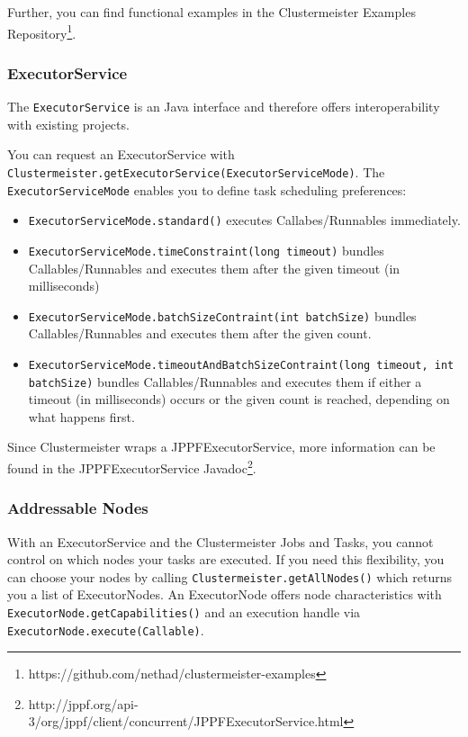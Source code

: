 \documentclass{article}
\begin{document}
Further, you can find functional examples in the Clustermeister Examples Repository\footnote{https://github.com/nethad/clustermeister-examples}.

\subsubsection{ExecutorService}

The \texttt{ExecutorService} is an Java interface and therefore offers interoperability with existing projects.

You can request an ExecutorService with \texttt{Clustermeister.getExecutorService(ExecutorServiceMode)}. The \texttt{ExecutorServiceMode} enables you to define task scheduling preferences:

\begin{itemize}
 \item \texttt{ExecutorServiceMode.standard()} executes Callabes/Runnables immediately.
 \item \texttt{ExecutorServiceMode.timeConstraint(long timeout)} bundles Callables/Runnables and executes them after the given timeout (in milliseconds)
 \item \texttt{ExecutorServiceMode.batchSizeContraint(int batchSize)} bundles Callables/Runnables and executes them after the given count.
 \item \texttt{ExecutorServiceMode.timeoutAndBatchSizeContraint(long timeout, int batchSize)} bundles Callables/Runnables and executes them if either a timeout (in milliseconds) occurs or the given count is reached, depending on what happens first.
\end{itemize}

Since Clustermeister wraps a JPPFExecutorService, more information can be found in the JPPFExecutorService Javadoc\footnote{http://jppf.org/api-3/org/jppf/client/concurrent/JPPFExecutorService.html}.

\subsubsection{Addressable Nodes}

With an ExecutorService and the Clustermeister Jobs and Tasks, you cannot control on which nodes your tasks are executed. If you need this flexibility, you can choose your nodes by calling \texttt{Clustermeister.getAllNodes()} which returns you a list of ExecutorNodes. An ExecutorNode offers node characteristics with \texttt{ExecutorNode.getCapabilities()} and an execution handle via \texttt{ExecutorNode.execute(Callable)}.
\end{document}
